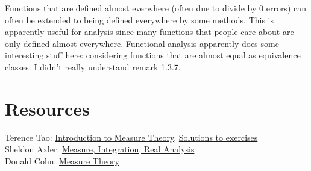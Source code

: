 \documentclass[answers,12pt]{exam}
\begin{document}
Functions that are defined almost everwhere (often due to divide by 0 errors) can often be extended to being defined everywhere by some methods.
This is apparently useful for analysis since many functions that people care about are only defined almost everywhere.
Functional analysis apparently does some interesting stuff here: considering functions that are almost equal as equivalence classes.
I didn't really understand remark 1.3.7.

\section{Resources}
Terence Tao: \href{https://terrytao.files.wordpress.com/2012/12/gsm-126-tao5-measure-book.pdf}{Introduction to Measure Theory}, \href{https://math.solverer.com/library/terence_tao/an_introduction_to_measure_theory}{Solutions to exercises}\\
Sheldon Axler: \href{https://measure.axler.net/MIRA.pdf}{Measure, Integration, Real Analysis}\\
Donald Cohn: \href{https://www.fayoum.edu.eg/stfsys/stfFiles/273/1342/Measure%20Theory%20(2nd%20ed.)%20-%20Cohn,%20Donald%20L._5990.pdf}{Measure Theory}
\end{document}
